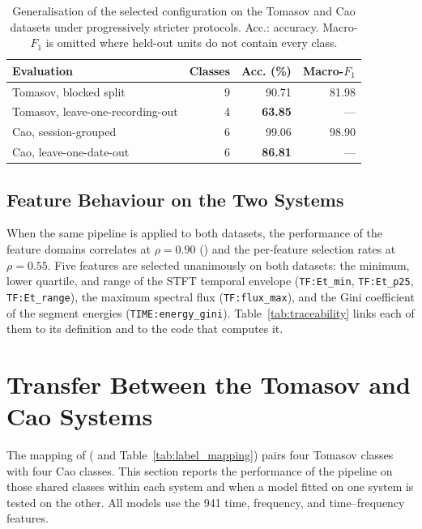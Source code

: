 \begin{table}[!htbp]
	\centering
	\caption{Generalisation of the selected configuration on the Tomasov and Cao datasets under progressively stricter protocols. Acc.: accuracy. Macro-$F_1$ is omitted where held-out units do not contain every class.}
	\label{tab:generalisation}
	\small
	\begin{tabular}{@{}lrrr@{}}
		\toprule
		\textbf{Evaluation} & \textbf{Classes} & \textbf{Acc. (\%)} & \textbf{Macro-$F_1$}\\
		\midrule
		Tomasov, blocked split             & 9 & 90.71 & 81.98\\
		Tomasov, leave-one-recording-out   & 4 & \textbf{63.85} & ---\\
		\midrule
		Cao, session-grouped               & 6 & 99.06 & 98.90\\
		Cao, leave-one-date-out            & 6 & \textbf{86.81} & ---\\
		\bottomrule
	\end{tabular}
\end{table}

\subsection{Feature Behaviour on the Two Systems}
\label{sec:resConsistency}
When the same pipeline is applied to both datasets, the performance of the feature domains correlates at $\rho = 0.90$ () and the per-feature selection rates at $\rho = 0.55$. Five features are selected unanimously on both datasets: the minimum, lower quartile, and range of the STFT temporal envelope (\texttt{TF:Et\_min}, \texttt{TF:Et\_p25}, \texttt{TF:Et\_range}), the maximum spectral flux (\texttt{TF:flux\_max}), and the Gini coefficient of the segment energies (\texttt{TIME:energy\_gini}). Table~\ref{tab:traceability} links each of them to its definition and to the code that computes it.

\section{Transfer Between the Tomasov and Cao Systems}
\label{sec:resMapping}
The mapping of  ( and Table~\ref{tab:label_mapping}) pairs four Tomasov classes with four Cao classes. This section reports the performance of the pipeline on those shared classes within each system and when a model fitted on one system is tested on the other. All models use the 941 time, frequency, and time--frequency features.

